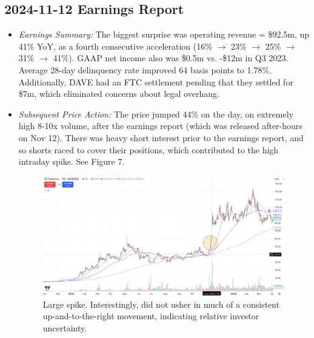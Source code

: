\documentclass[11pt]{article}
\begin{document}
    \subsection{2024-11-12 Earnings Report}
        \begin{itemize}
            \item \textit{Earnings Summary:} The biggest surprise was operating revenue = \$92.5m, up 41\% YoY, as a fourth consecutive acceleration (16\% $\rightarrow$ 23\% $\rightarrow$ 25\% $\rightarrow$ 31\% $\rightarrow$ 41\%). GAAP net income also was \$0.5m vs. -\$12m in Q3 2023. Average 28-day delinquency rate improved 64 basis points to 1.78\%. Additionally, DAVE had an FTC settlement pending that they settled for \$7m, which eliminated concerns about legal overhang.
            \item \textit{Subsequent Price Action:} The price jumped 44\% on the day, on extremely high 8-10x volume, after the earnings report (which was released after-hours on Nov 12). There was heavy short interest prior to the earnings report, and so shorts raced to cover their positions, which contributed to the high intraday spike. See Figure 7.
            \begin{figure}[h]
                \centering \includegraphics[width=0.8\linewidth]{images/DAVE1.png}
                \caption{Large spike. Interestingly, did not usher in much of a consistent up-and-to-the-right movement, indicating relative investor uncertainty.}
            \end{figure}
        \end{itemize}
\end{document}
